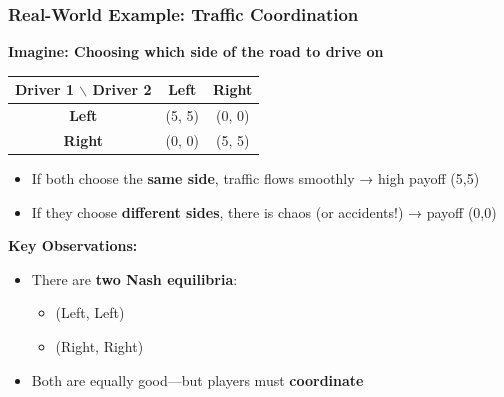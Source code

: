 \begin{frame}[fragile]\frametitle{Real-World Example: Traffic Coordination}

\textbf{Imagine: Choosing which side of the road to drive on}

\begin{center}
\begin{tabular}{|c|c|c|}
  \hline
  \textbf{Driver 1 $\backslash$ Driver 2} & \textbf{Left} & \textbf{Right} \\
  \hline
  \textbf{Left} & (5, 5) & (0, 0) \\
  \hline
  \textbf{Right} & (0, 0) & (5, 5) \\
  \hline
\end{tabular}
\end{center}

\vspace{6pt}

\begin{itemize}
  \item If both choose the \textbf{same side}, traffic flows smoothly → high payoff (5,5)
  
  \item If they choose \textbf{different sides}, there is chaos (or accidents!) → payoff (0,0)
\end{itemize}

\vspace{8pt}

\textbf{Key Observations:}
\begin{itemize}
  \item There are \textbf{two Nash equilibria}:
  \begin{itemize}
    \item (Left, Left)
    \item (Right, Right)
  \end{itemize}
  
  \item Both are equally good—but players must \textbf{coordinate}
\end{itemize}

\end{frame}

